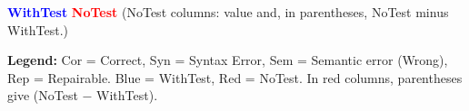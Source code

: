 \documentclass{article}
\begin{document}
\begin{table}[ht]
\centering
\caption{With-Test vs No-Test (Alloy-to-Alloy, Gemini) by Predicate with Repairability}
\label{tab:with_vs_without_test_alloy2alloy_gemini31flashlitepreview}

\small
\textcolor{blue}{\textbf{WithTest}} \quad \textcolor{red}{\textbf{NoTest}} \quad (NoTest columns: value and, in parentheses, NoTest minus WithTest.)

\vspace{0.5em}

\vspace{0.5em}
\raggedright
\textbf{Legend:} Cor = Correct, Syn = Syntax Error, Sem = Semantic error (Wrong), Rep = Repairable. Blue = WithTest, Red = NoTest. In red columns, parentheses give (NoTest $-$ WithTest).
\end{table}
\end{document}
